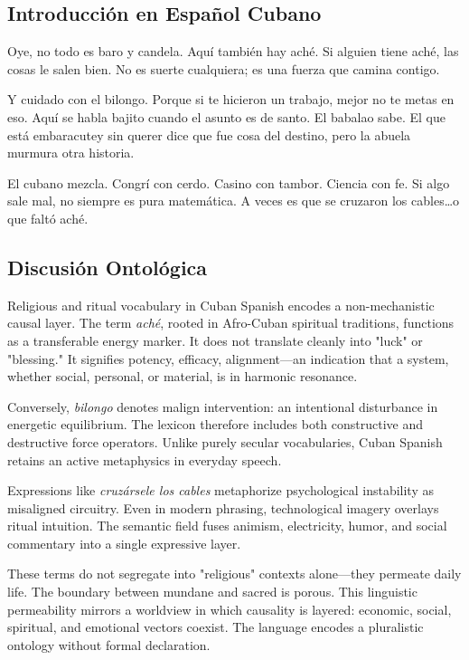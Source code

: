 \documentclass[12pt]{article}
\begin{document}
\subsection*{Introducción en Español Cubano}

Oye, no todo es baro y candela. Aquí también hay aché. Si alguien tiene aché, las cosas le salen bien. No es suerte cualquiera; es una fuerza que camina contigo.

Y cuidado con el bilongo. Porque si te hicieron un trabajo, mejor no te metas en eso. Aquí se habla bajito cuando el asunto es de santo. El babalao sabe. El que está embaracutey sin querer dice que fue cosa del destino, pero la abuela murmura otra historia.

El cubano mezcla. Congrí con cerdo. Casino con tambor. Ciencia con fe. Si algo sale mal, no siempre es pura matemática. A veces es que se cruzaron los cables\ldots o que faltó aché.

\subsection*{Discusión Ontológica}

Religious and ritual vocabulary in Cuban Spanish encodes a non-mechanistic causal layer. The term \textit{aché}, rooted in Afro-Cuban spiritual traditions, functions as a transferable energy marker. It does not translate cleanly into "luck" or "blessing." It signifies potency, efficacy, alignment---an indication that a system, whether social, personal, or material, is in harmonic resonance.

Conversely, \textit{bilongo} denotes malign intervention: an intentional disturbance in energetic equilibrium. The lexicon therefore includes both constructive and destructive force operators. Unlike purely secular vocabularies, Cuban Spanish retains an active metaphysics in everyday speech.

Expressions like \textit{cruzársele los cables} metaphorize psychological instability as misaligned circuitry. Even in modern phrasing, technological imagery overlays ritual intuition. The semantic field fuses animism, electricity, humor, and social commentary into a single expressive layer.

These terms do not segregate into "religious" contexts alone---they permeate daily life. The boundary between mundane and sacred is porous. This linguistic permeability mirrors a worldview in which causality is layered: economic, social, spiritual, and emotional vectors coexist. The language encodes a pluralistic ontology without formal declaration.
\end{document}
